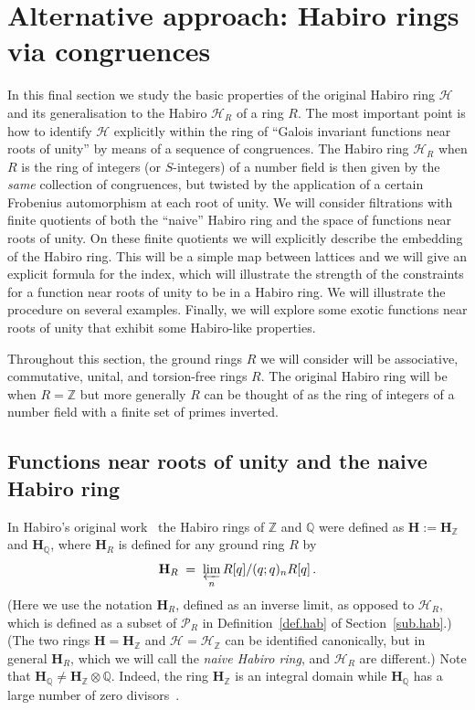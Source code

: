 \documentclass[12pt,reqno]{amsart}
\theoremstyle{definition}
\def\BZ{\mathbb Z}
\def\BQ{\mathbb Q}
\def\calP{\mathcal P}
\def\calH{\mathcal H}
\def\HH{\mathbf H}
\def\be{\begin{equation}}
\def\ee{\end{equation}}
\def\={\;=\;}
\begin{document}

\section{Alternative approach: Habiro rings via congruences}
\label{sec.hab}

In this final section we study the basic properties of the original Habiro ring
$\calH$ and its generalisation to the Habiro $\calH_{R}$ of a ring $R$.
The most important point is how to identify $\calH$ explicitly within the
ring of ``Galois invariant functions near roots of unity'' by means of a
sequence of congruences. The Habiro ring $\calH_{R}$ when $R$ is the ring of integers
(or $S$-integers) of a
number field is then given by the \emph{same} collection of congruences,
but twisted by the application of a certain Frobenius automorphism at each root of
unity. We will consider filtrations with finite quotients of both the ``naive''
Habiro ring
and the space of functions near roots of unity. On these finite quotients we will
explicitly
describe the embedding of the Habiro ring. This will be a simple map between lattices
and we will give an explicit formula for the index, which will illustrate the
strength of the constraints for a function near roots of unity to be in a Habiro ring.
We will illustrate the procedure on several examples. Finally, we will explore some
exotic functions near roots of unity that exhibit some Habiro-like properties.

Throughout this section, the ground rings $R$ we will consider will be associative,
commutative, unital, and torsion-free rings $R$. The original Habiro ring will be
when $R=\BZ$ but more generally $R$ can be thought of as the ring of integers of a
number field with a finite set of primes inverted.

\subsection{Functions near roots of unity and the naive Habiro ring}
\label{sec:naive}

In Habiro's original work~\cite{Habiro:completion} the Habiro rings of $\BZ$ and
$\BQ$ were defined as $\HH:=\HH_\BZ$ and $\HH_{\BQ}$, where $\HH_R$ is defined for
any ground ring $R$ by
\be
\label{eq:Hnaive}
\HH_{R} \= \varprojlim_n R[q]/(q;q)_{n}R[q]\,.
\ee
(Here we use the notation $\HH_R$, defined as an inverse limit, as opposed to
$\calH_R$, which is defined as a subset of $\calP_R$ in Definition~\ref{def.hab} of
Section~\ref{sub.hab}.)
(The two rings $\HH=\HH_\BZ$ and $\calH=\calH_\BZ$ can be identified canonically,
but in general $\HH_R$, which we will call the \emph{naive Habiro ring}, and
$\calH_R$ are different.)
Note that $\HH_\BQ\neq\HH_{\BZ}\otimes\BQ$. Indeed, the ring
$\HH_{\BZ}$ is an integral domain while $\HH_{\BQ}$ has a large number of zero
divisors~\cite[Sec. 7.5]{Habiro:completion}.
\end{document}
